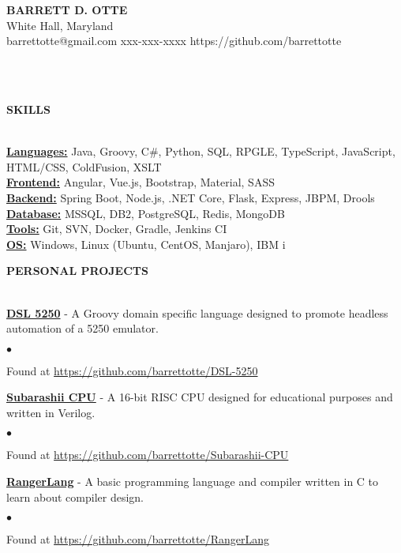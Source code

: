 \documentclass{article}
\newcommand{\lineunder}{
	\vspace*{-4pt}\\ 
	\hspace*{-18pt}\hrulefill \\
}
\newcommand{\header}[1]{
	{\hspace*{-15pt}\vspace*{6pt}\textsc{#1}}\vspace*{-6pt}\lineunder
}
\newcommand{\project}[2]{
	{\textbf{\underline{#1}} - #2{\hfill}\vspace*{3pt}}
}
\newcommand{\contact}[5]{
	\vspace*{-8pt}
	\begin{center}
		{\Large \textbf \scshape {#1}}\\
		\normalsize #2\\
		\normalsize #3 \hspace*{20pt} 
		\normalsize #4 \hspace*{20pt}
		\normalsize #5
		\lineunder
	\end{center}
	\vspace*{-8pt}
}
\newenvironment{resumecontent}{
	\begin{list}
		{\small$\bullet$}{\topsep 0pt \itemsep -2pt}}{\vspace*{4pt}
	\end{list}
}
\newcommand{\resumeheader}[1]{
	\vspace*{10pt}
	\header{\textbf{#1}}
    \vspace*{5pt}
}
\begin{document}
	\normalsize
	\smallskip
	\vspace*{-44pt}

	\contact
		{\bfseries BARRETT D. OTTE}
		{White Hall, Maryland}
		{barrettotte@gmail.com}
		{xxx-xxx-xxxx}
		{https://github.com/barrettotte}

	\resumeheader{SKILLS}
		\textbf{\underline{Languages:}}
			Java, Groovy, C\#, Python, SQL, RPGLE, TypeScript, JavaScript, HTML/CSS, ColdFusion, XSLT \\ \vspace*{5pt}
		\textbf{\underline{Frontend:}}
			Angular, Vue.js, Bootstrap, Material, SASS \\ \vspace*{5pt}
        \textbf{\underline{Backend:}}
			Spring Boot, Node.js, .NET Core, Flask, Express, JBPM, Drools \\ \vspace*{5pt}
        \textbf{\underline{Database:}}
			MSSQL, DB2, PostgreSQL, Redis, MongoDB \\ \vspace*{5pt}
		\textbf{\underline{Tools:}}
			Git, SVN, Docker, Gradle, Jenkins CI \\ \vspace*{5pt}
        \textbf{\underline{OS:}}
            Windows, Linux (Ubuntu, CentOS, Manjaro), IBM i

	\resumeheader{PERSONAL PROJECTS}
		\project
			{DSL 5250}
			{A Groovy domain specific language designed to promote headless automation of a 5250 emulator.}
			\begin{resumecontent}
				\item Found at \href{https://github.com/barrettotte/DSL-5250}
					{https://github.com/barrettotte/DSL-5250}
			\end{resumecontent}
            \vspace*{3pt}
		\project
			{Subarashii CPU}
			{A 16-bit RISC CPU designed for educational purposes and written in Verilog.}
            \begin{resumecontent}
				\item Found at \href{https://github.com/barrettotte/Subarashii-CPU}
					{https://github.com/barrettotte/Subarashii-CPU}
			\end{resumecontent}
            \vspace*{3pt}
		\project
			{RangerLang}
			{A basic programming language and compiler written in C to learn about compiler design.}
            \begin{resumecontent}
				\item Found at \href{https://github.com/barrettotte/RangerLang}
					{https://github.com/barrettotte/RangerLang}
			\end{resumecontent}
\end{document}
